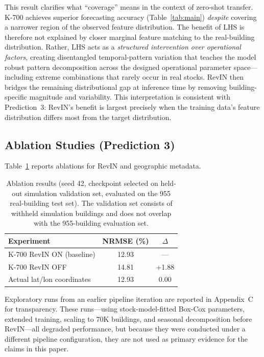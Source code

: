 \documentclass[preprint,12pt,authoryear]{elsarticle}
\begin{document}
This result clarifies what ``coverage'' means in the context of zero-shot transfer. K-700 achieves superior forecasting accuracy (Table~\ref{tab:main}) \emph{despite} covering a narrower region of the observed feature distribution. The benefit of LHS is therefore not explained by closer marginal feature matching to the real-building distribution. Rather, LHS acts as a \emph{structured intervention over operational factors}, creating disentangled temporal-pattern variation that teaches the model robust pattern decomposition across the designed operational parameter space---including extreme combinations that rarely occur in real stocks. RevIN then bridges the remaining distributional gap at inference time by removing building-specific magnitude and variability. This interpretation is consistent with Prediction~3: RevIN's benefit is largest precisely when the training data's feature distribution differs most from the target distribution.

\subsection{Ablation Studies (Prediction 3)}
\label{sec:ablation}

Table~\ref{tab:ablation} reports ablations for RevIN and geographic metadata.

\begin{table}[htbp]
\caption{Ablation results (seed 42, checkpoint selected on held-out simulation validation set, evaluated on the 955 real-building test set). The validation set consists of withheld simulation buildings and does not overlap with the 955-building evaluation set.}
\label{tab:ablation}
\centering
\begin{tabular}{lcc}
\toprule
Experiment & NRMSE (\%) & $\Delta$ \\
\midrule
K-700 RevIN ON (baseline) & 12.93 & --- \\
K-700 RevIN OFF & 14.81 & +1.88 \\
Actual lat/lon coordinates & 12.93 & 0.00 \\
\bottomrule
\end{tabular}
\end{table}

Exploratory runs from an earlier pipeline iteration are reported in Appendix~C for transparency. These runs---using stock-model-fitted Box-Cox parameters, extended training, scaling to 70K buildings, and seasonal decomposition before RevIN---all degraded performance, but because they were conducted under a different pipeline configuration, they are not used as primary evidence for the claims in this paper.
\end{document}

